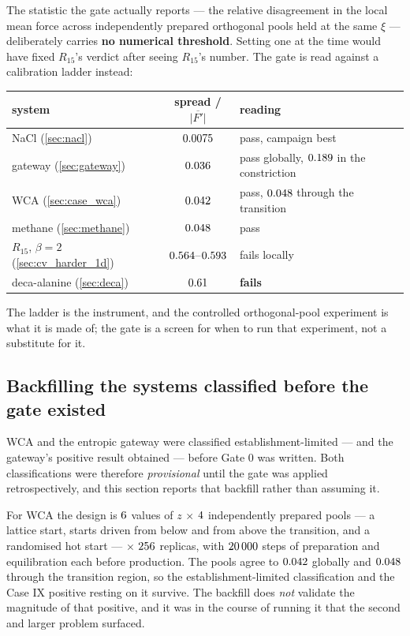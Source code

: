 The statistic the gate actually reports --- the relative disagreement in the local mean force
across independently prepared orthogonal pools held at the same $\xi$ --- deliberately carries
\textbf{no numerical threshold}. Setting one at the time would have fixed $R_{15}$'s verdict
after seeing $R_{15}$'s number. The gate is read against a calibration ladder instead:

\begin{center}
\begin{tabular}{lcl}
\toprule
system & spread / $\overline{|F'|}$ & reading \\
\midrule
NaCl (\cref{sec:nacl})            & $0.0075$   & pass, campaign best \\
gateway (\cref{sec:gateway})      & $0.036$          & pass globally, $0.189$ in the constriction \\
WCA (\cref{sec:case_wca})              & $0.042$              & pass, $0.048$ through the transition \\
methane (\cref{sec:methane})      & $0.048$   & pass \\
$R_{15}$, $\beta=2$ (\cref{sec:cv_harder_1d}) & $0.564$--$0.593$ & fails locally \\
deca-alanine (\cref{sec:deca})    & $0.61$         & \textbf{fails} \\
\bottomrule
\end{tabular}
\end{center}

The ladder is the instrument, and the controlled orthogonal-pool experiment is what it is made
of; the gate is a screen for when to run that experiment, not a substitute for it.

\subsection{Backfilling the systems classified before the gate existed}

WCA and the entropic gateway were classified establishment-limited --- and the gateway's positive
result obtained --- before Gate 0 was written. Both classifications were therefore
\emph{provisional} until the gate was applied retrospectively, and this section reports that
backfill rather than assuming it.

For WCA the design is $6$ values of $z$ $\times$ $4$ independently prepared
pools --- a lattice start, starts driven from below and from above the transition, and a
randomised hot start --- $\times$ $256$ replicas, with $20\,000$ steps of
preparation and equilibration each before production. The pools agree to $0.042$ globally and
$0.048$ through the transition region, so the establishment-limited classification and
the Case IX positive resting on it survive. The backfill does \emph{not} validate the magnitude
of that positive, and it was in the course of running it that the second and larger problem
surfaced.

